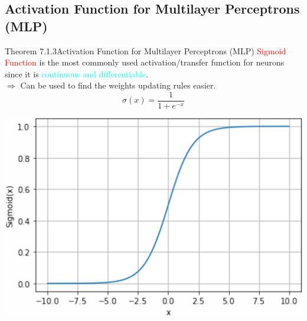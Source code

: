 \documentclass{book}
\begin{document}
\subsection{Activation Function for Multilayer Perceptrons (MLP)}
\begin{thmBox}{Theorem 7.1.3}{Activation Function for Multilayer Perceptrons (MLP)}
    \textcolor{red}{Sigmoid Function} is the most commonly used activation/transfer function for neurons since it is \textcolor{cyan}{continuous and differentiable}.\\
    $\Rightarrow$ Can be used to find the weights updating rules easier.
    \[
        \sigma(x) = \frac{1}{1 + e^{-x}}
    \]
    \begin{center}
        \includegraphics[scale=0.15]{chapter 7/ch7_figure2.jpeg}
    \end{center}
\end{thmBox}
\end{document}
